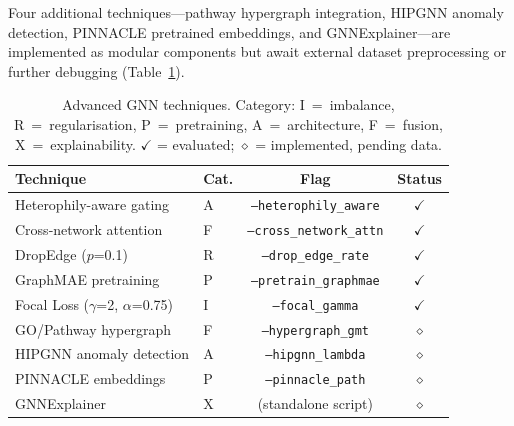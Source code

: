 Four additional techniques---pathway hypergraph integration, HIPGNN anomaly
detection, PINNACLE pretrained embeddings, and GNNExplainer---are implemented as
modular components but await external dataset preprocessing or further debugging
(Table~\ref{tab:m5_summary}).

\begin{table}[ht]
  \centering
  \caption{Advanced GNN techniques. Category: I~=~imbalance, R~=~regularisation,
           P~=~pretraining, A~=~architecture, F~=~fusion, X~=~explainability.
           $\checkmark$ = evaluated; $\diamond$ = implemented, pending data.}
  \label{tab:m5_summary}
  \small
  \begin{tabular}{llcc}
    \toprule
    \textbf{Technique} & \textbf{Cat.} & \textbf{Flag} & \textbf{Status} \\
    \midrule
    Heterophily-aware gating                      & A & \texttt{--heterophily\_aware}   & $\checkmark$ \\
    Cross-network attention                       & F & \texttt{--cross\_network\_attn} & $\checkmark$ \\
    DropEdge ($p$=0.1)                            & R & \texttt{--drop\_edge\_rate}     & $\checkmark$ \\
    GraphMAE pretraining                          & P & \texttt{--pretrain\_graphmae}   & $\checkmark$ \\
    Focal Loss ($\gamma$=2, $\alpha$=0.75)        & I & \texttt{--focal\_gamma}         & $\checkmark$ \\
    GO/Pathway hypergraph                         & F & \texttt{--hypergraph\_gmt}      & $\diamond$ \\
    HIPGNN anomaly detection                      & A & \texttt{--hipgnn\_lambda}       & $\diamond$ \\
    PINNACLE embeddings                           & P & \texttt{--pinnacle\_path}       & $\diamond$ \\
    GNNExplainer                                  & X & (standalone script)             & $\diamond$ \\
    \bottomrule
  \end{tabular}
\end{table}
